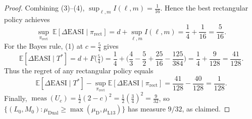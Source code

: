 \begin{proof}
Combining (3)--(4), $\sup_{\ell,m} I(\ell,m)=\tfrac{1}{16}$. Hence the best rectangular policy achieves
\[
\sup_{\pi_{\mathrm{rect}}}\ \mathbb{E}[\Delta\mathrm{EASI}\mid \pi_{\mathrm{rect}}]= d+\sup_{\ell,m}I(\ell,m)=\frac14+\frac{1}{16}=\frac{5}{16}.
\]
For the Bayes rule, (1) at $c=\tfrac54$ gives
\[
\mathbb{E}[\Delta\mathrm{EASI}\mid T^{*}]= d+F\Big(\tfrac54\Big)=\frac14+\Big(\frac{4}{3}-\frac{5}{2}+\frac{25}{16}-\frac{125}{384}\Big)=\frac{1}{4}+\frac{9}{128}=\frac{41}{128}.
\]
Thus the regret of any rectangular policy equals
\[
\mathbb{E}[\Delta\mathrm{EASI}\mid T^{*}]-\sup_{\pi_{\mathrm{rect}}}\mathbb{E}[\Delta\mathrm{EASI}\mid \pi_{\mathrm{rect}}]
=\frac{41}{128}-\frac{40}{128}=\frac{1}{128}.
\]
Finally, $\operatorname{meas}(U_c)=\tfrac12(2-c)^2=\tfrac12(\tfrac34)^2=\tfrac{9}{32}$, so $\{(L_0,M_0): \mu_{\mathrm{Dual}}\ge\max(\mu_{\mathrm D},\mu_{\mathrm{L13}})\}$ has measure $9/32$, as claimed.\qedhere
\end{proof}
